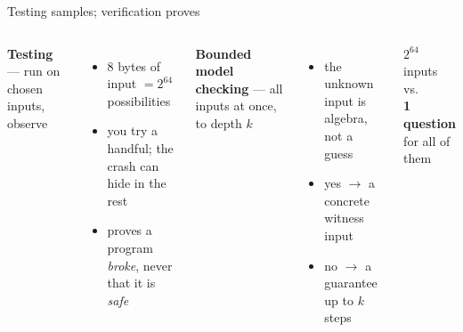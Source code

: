 \documentclass[aspectratio=169]{beamer}
\newcommand{\lab}[1]{{\footnotesize\color{ink!65}#1}}
\begin{document}
\begin{frame}{Testing samples; verification proves}
  \begin{columns}[T]
    \footnotesize
      \textbf{Testing} --- \lab{run on chosen inputs, observe}
      \begin{itemize}\setlength\itemsep{0.15em}
        \item 8 bytes of input $= 2^{64}$ possibilities
        \item you try a handful; the crash can hide in the rest
        \item proves a program \emph{broke}, never that it is \emph{safe}
      \end{itemize}
      \vspace{0.3em}
      \textbf{Bounded model checking} --- \lab{all inputs at once, to depth $k$}
      \begin{itemize}\setlength\itemsep{0.15em}
        \item the unknown input is algebra, not a guess
        \item yes $\rightarrow$ a concrete witness input
        \item no $\rightarrow$ a guarantee up to $k$ steps
      \end{itemize}
      \centering\vspace{0.6em}
      {\fontsize{38}{40}\selectfont\textbf{$2^{64}$}}\\[3pt]\lab{inputs}\\[1em]
      {\Large vs.}\\[1em]
      {\fontsize{22}{24}\selectfont\textbf{1 question}}\\[2pt]\lab{for all of them}
  \end{columns}
\end{frame}
\end{document}
